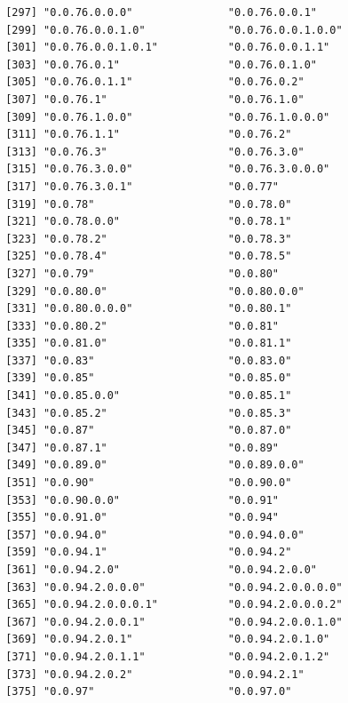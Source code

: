 \documentclass[
  letterpaper,
  DIV=11,
  numbers=noendperiod]{scrreprt}
\begin{document}
\begin{verbatim}
 [297] "0.0.76.0.0.0"               "0.0.76.0.0.1"              
 [299] "0.0.76.0.0.1.0"             "0.0.76.0.0.1.0.0"          
 [301] "0.0.76.0.0.1.0.1"           "0.0.76.0.0.1.1"            
 [303] "0.0.76.0.1"                 "0.0.76.0.1.0"              
 [305] "0.0.76.0.1.1"               "0.0.76.0.2"                
 [307] "0.0.76.1"                   "0.0.76.1.0"                
 [309] "0.0.76.1.0.0"               "0.0.76.1.0.0.0"            
 [311] "0.0.76.1.1"                 "0.0.76.2"                  
 [313] "0.0.76.3"                   "0.0.76.3.0"                
 [315] "0.0.76.3.0.0"               "0.0.76.3.0.0.0"            
 [317] "0.0.76.3.0.1"               "0.0.77"                    
 [319] "0.0.78"                     "0.0.78.0"                  
 [321] "0.0.78.0.0"                 "0.0.78.1"                  
 [323] "0.0.78.2"                   "0.0.78.3"                  
 [325] "0.0.78.4"                   "0.0.78.5"                  
 [327] "0.0.79"                     "0.0.80"                    
 [329] "0.0.80.0"                   "0.0.80.0.0"                
 [331] "0.0.80.0.0.0"               "0.0.80.1"                  
 [333] "0.0.80.2"                   "0.0.81"                    
 [335] "0.0.81.0"                   "0.0.81.1"                  
 [337] "0.0.83"                     "0.0.83.0"                  
 [339] "0.0.85"                     "0.0.85.0"                  
 [341] "0.0.85.0.0"                 "0.0.85.1"                  
 [343] "0.0.85.2"                   "0.0.85.3"                  
 [345] "0.0.87"                     "0.0.87.0"                  
 [347] "0.0.87.1"                   "0.0.89"                    
 [349] "0.0.89.0"                   "0.0.89.0.0"                
 [351] "0.0.90"                     "0.0.90.0"                  
 [353] "0.0.90.0.0"                 "0.0.91"                    
 [355] "0.0.91.0"                   "0.0.94"                    
 [357] "0.0.94.0"                   "0.0.94.0.0"                
 [359] "0.0.94.1"                   "0.0.94.2"                  
 [361] "0.0.94.2.0"                 "0.0.94.2.0.0"              
 [363] "0.0.94.2.0.0.0"             "0.0.94.2.0.0.0.0"          
 [365] "0.0.94.2.0.0.0.1"           "0.0.94.2.0.0.0.2"          
 [367] "0.0.94.2.0.0.1"             "0.0.94.2.0.0.1.0"          
 [369] "0.0.94.2.0.1"               "0.0.94.2.0.1.0"            
 [371] "0.0.94.2.0.1.1"             "0.0.94.2.0.1.2"            
 [373] "0.0.94.2.0.2"               "0.0.94.2.1"                
 [375] "0.0.97"                     "0.0.97.0"                  

\end{verbatim}
\end{document}
